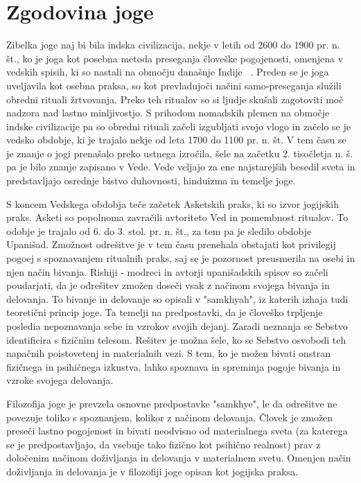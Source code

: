 \documentclass[a4paper, 12pt]{book}
\begin{document}
\section{Zgodovina joge}
Zibelka joge naj bi bila indska civilizacija, nekje v letih od 2600 do 1900 pr. n. št., ko je joga kot posebna metoda preseganja človeške pogojenosti, omenjena v vedskih spisih, ki so nastali na območju današnje Indije ~\cite{prirocnik}. Preden se je joga uveljavila kot osebna praksa, so kot prevladujoči načini samo-preseganja služili obredni rituali žrtvovanja. Preko teh ritualov so si ljudje skušali zagotoviti moč nadzora nad lastno minljivostjo. S prihodom nomadskih plemen na območje indske civilizacije pa so obredni rituali začeli izgubljati svojo vlogo in začelo se je vedsko obdobje, ki je trajalo nekje od leta 1700 do 1100 pr. n. št. V tem času se je znanje o jogi prenašalo preko ustnega izročila, šele na začetku 2. tisočletja n. š. pa je bilo znanje zapisano v Vede. Vede veljajo za ene najstarejših besedil sveta in predstavljajo osrednje bistvo duhovnosti, hinduizma in temelje joge.

S koncem Vedskega obdobja teče začetek Asketskih praks, ki so izvor jogijskih praks. Asketi so popolnoma zavračili avtoriteto Ved in pomembnost ritualov. To odobje je trajalo od 6. do 3. stol. pr. n. št., za tem pa je sledilo obdobje Upanišad. Zmožnost odrešitve je v tem času prenehala obstajati kot privilegij pogoej s spoznavanjem ritualnih praks, saj se je pozornost preusmerila na osebi in njen način bivanja. Rishiji - modreci in avtorji upanišadskih spisov so začeli poudarjati, da je odrešitev zmožen doseči vsak z načinom svojega bivanja in delovanja.  To bivanje in delovanje so opisali v "samkhyah", iz katerih izhaja tudi teoretični princip joge. Ta temelji na predpostavki, da je človeško trpljenje posledia nepoznavanja sebe in vzrokov svojih dejanj. Zaradi neznanja se Sebstvo identificira s fizičnim telesom. Rešitev je možna šele, ko se Sebstvo osvobodi teh napačnih poistovetenj in materialnih vezi. S tem, ko je možen bivati onstran fizičnega in psihičnega izkustva, lahko spoznava in spreminja pogoje bivanja in vzroke svojega delovanja. 

Filozofija joge je prevzela osnovne predpostavke "samkhye", le da odrešitve ne povezuje toliko s spoznanjem, kolikor z načinom delovanja. Človek je zmožen preseči lastno pogojenost in bivati neodvisno od materialnega sveta (za katerega se je predpostavljajo, da vsebuje tako fizično kot psihično realnost) prav z določenim načinom doživljanja in delovanja v materialnem svetu. Omenjen način doživljanja in delovanja je v filozofiji joge opisan kot jogijska praksa.
\end{document}
